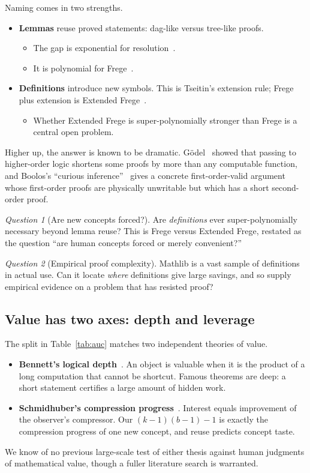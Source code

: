 \documentclass[11pt]{article}
\theoremstyle{remark}
\newtheorem{question}{Question}
\begin{document}
Naming comes in two strengths.
\begin{itemize}
\item \textbf{Lemmas} reuse proved statements: dag-like versus tree-like proofs.
  \begin{itemize}
  \item The gap is exponential for resolution~\cite{bsiw}.
  \item It is polynomial for Frege~\cite{krajicek}.
  \end{itemize}
\item \textbf{Definitions} introduce new symbols. This is Tseitin's extension rule; Frege
  plus extension is Extended Frege~\cite{cookreckhow}.
  \begin{itemize}
  \item Whether Extended Frege is super-polynomially stronger than Frege is a central open
    problem.
  \end{itemize}
\end{itemize}
Higher up, the answer is known to be dramatic. G\"odel~\cite{godel} showed that passing to
higher-order logic shortens some proofs by more than any computable function, and Boolos's
``curious inference''~\cite{boolos} gives a concrete first-order-valid argument whose
first-order proofs are physically unwritable but which has a short second-order proof.

\begin{question}[Are new concepts forced?]
Are \emph{definitions} ever super-polynomially necessary beyond lemma reuse? This is
Frege versus Extended Frege, restated as the question ``are human concepts forced or merely
convenient?''
\end{question}

\begin{question}[Empirical proof complexity]
Mathlib is a vast sample of definitions in actual use. Can it locate \emph{where}
definitions give large savings, and so supply empirical evidence on a problem that has
resisted proof?
\end{question}

\subsection{Value has two axes: depth and leverage}

The split in Table~\ref{tab:auc} matches two independent theories of value.
\begin{itemize}
\item \textbf{Bennett's logical depth}~\cite{bennett}. An object is valuable when it is
  the product of a long computation that cannot be shortcut. Famous theorems are deep: a
  short statement certifies a large amount of hidden work.
\item \textbf{Schmidhuber's compression progress}~\cite{schmidhuber}. Interest equals
  improvement of the observer's compressor. Our $(k-1)(b-1)-1$ is exactly the compression
  progress of one new concept, and reuse predicts concept taste.
\end{itemize}
We know of no previous large-scale test of either thesis against human judgments of
mathematical value, though a fuller literature search is warranted.
\end{document}
